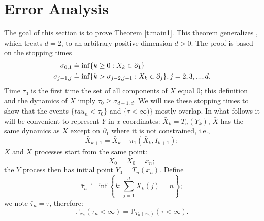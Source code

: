 \documentclass[11pt,a4paper]{article}
\begin{document}
\section{Error Analysis}
The goal of this section is to prove Theorem \ref{t:main1}.
This theorem generalizes \cite[Proposition 8]{sezer2018approximation}, 
which treats $d=2$, to an arbitrary positive dimension $d > 0$.
The proof is based on the stopping times
\begin{align}\label{d:sigma01}
\sigma_{0,1} &\doteq \inf \{k \ge 0: X_k \in \partial_1\}\\
\sigma_{j-1,j} &\doteq \inf \{k > \sigma_{j-2,j-1}: X_k \in \partial_j\},  \notag
j=2,3,...,d.
\end{align}
Time $\tau_0$ is the first time the set of all components of $X$ equal $0$; this definition and the dynamics of $X$ imply
$\tau_0 \ge \sigma_{d-1,d}.$
We will use these stopping times to show that the events 
$\{tau_n < \tau_0\}$ and $\{\tau < \infty) \}$ mostly overlap. 
In what follows it will be convenient to represent $Y$ in $x$-coordinates:
$\bar{X}_k = T_n(Y_k)$,
$\bar{X}$ has the same dynamics as $X$ except on $\partial_1$ where it is not
constrained, i.e.,
\[
\bar{X}_{k+1} = \bar{X}_k + \pi_1(\bar{X}_k, I_{k+1});
\]
$\bar{X}$ and $X$ processes start from the same point:
\begin{equation}\label{e:sameinitcond}
X_0 = \bar{X}_0 = x_n;
\end{equation}
the $Y$ process then has initial point $Y_0 = T_n(x_n).$
Define
\[
\bar{\tau}_n \doteq \inf\left \{k: \sum_{j=1}^d \bar{X}_k(j) = n \right\};
\]
we note $\bar{\tau}_n = \tau$, therefore:
\[
{\mathbb P}_{x_n}(\tau_n < \infty) = {\mathbb P}_{T_n(x_n)}(\tau < \infty).
\]
\end{document}
